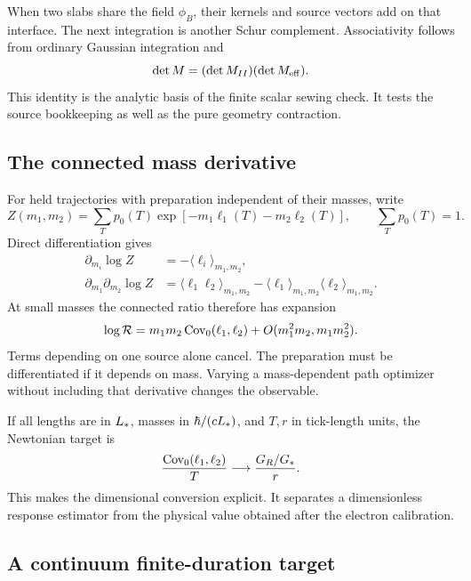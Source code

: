 When two slabs share the field $\phi_B$, their kernels and source vectors add on that interface. The next integration is another Schur complement. Associativity follows from ordinary Gaussian integration and
\begin{equation}
\det M=(\det M_{II})(\det M_{\rm eff}).
\end{equation}
This identity is the analytic basis of the finite scalar sewing check. It tests the source bookkeeping as well as the pure geometry contraction.

\subsection{The connected mass derivative}

For held trajectories with preparation independent of their masses, write
\begin{equation}
Z(m_1,m_2)=\sum_Tp_0(T)
\exp[-m_1\ell_1(T)-m_2\ell_2(T)],\qquad
\sum_Tp_0(T)=1.
\end{equation}
Direct differentiation gives
\begin{align}
\partial_{m_i}\log Z&=-\langle\ell_i\rangle_{m_1,m_2},\\
\partial_{m_1}\partial_{m_2}\log Z
&=\langle\ell_1\ell_2\rangle_{m_1,m_2}
-\langle\ell_1\rangle_{m_1,m_2}
\langle\ell_2\rangle_{m_1,m_2}.
\end{align}
At small masses the connected ratio therefore has expansion
\begin{equation}
\log\mathcal R=m_1m_2\operatorname{Cov}_0(\ell_1,\ell_2)
+O(m_1^2m_2,m_1m_2^2).
\end{equation}
Terms depending on one source alone cancel. The preparation must be differentiated if it depends on mass. Varying a mass-dependent path optimizer without including that derivative changes the observable.

If all lengths are in $L_*$, masses in $\hbar/(cL_*)$, and $T,r$ in tick-length units, the Newtonian target is
\begin{equation}
\frac{\operatorname{Cov}_0(\ell_1,\ell_2)}{T}
\longrightarrow\frac{G_R/G_*}{r}.
\label{eq:dimensionlessforce}
\end{equation}
This makes the dimensional conversion explicit. It separates a dimensionless response estimator from the physical value obtained after the electron calibration.

\subsection{A continuum finite-duration target}

